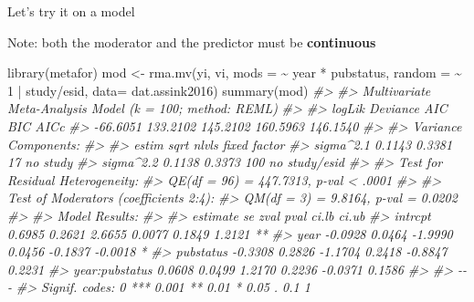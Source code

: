 \documentclass[
]{book}
\newenvironment{Shaded}{\begin{snugshade}}{\end{snugshade}}
\newcommand{\AttributeTok}[1]{\textcolor[rgb]{0.77,0.63,0.00}{#1}}
\newcommand{\CommentTok}[1]{\textcolor[rgb]{0.56,0.35,0.01}{\textit{#1}}}
\newcommand{\DecValTok}[1]{\textcolor[rgb]{0.00,0.00,0.81}{#1}}
\newcommand{\FunctionTok}[1]{\textcolor[rgb]{0.00,0.00,0.00}{#1}}
\newcommand{\NormalTok}[1]{#1}
\newcommand{\OtherTok}[1]{\textcolor[rgb]{0.56,0.35,0.01}{#1}}
\newcommand{\SpecialCharTok}[1]{\textcolor[rgb]{0.00,0.00,0.00}{#1}}
\begin{document}
Let's try it on a model

Note: both the moderator and the predictor must be \textbf{continuous}

\begin{Shaded}
\begin{Highlighting}[]
\FunctionTok{library}\NormalTok{(metafor)}
\NormalTok{mod }\OtherTok{\textless{}{-}} \FunctionTok{rma.mv}\NormalTok{(yi, vi, }\AttributeTok{mods =} \SpecialCharTok{\textasciitilde{}}\NormalTok{ year }\SpecialCharTok{*}\NormalTok{ pubstatus, }\AttributeTok{random =} \SpecialCharTok{\textasciitilde{}} \DecValTok{1} \SpecialCharTok{|}\NormalTok{ study}\SpecialCharTok{/}\NormalTok{esid, }\AttributeTok{data=}\NormalTok{ dat.assink2016)}
\FunctionTok{summary}\NormalTok{(mod)}
\CommentTok{\#\textgreater{} }
\CommentTok{\#\textgreater{} Multivariate Meta{-}Analysis Model (k = 100; method: REML)}
\CommentTok{\#\textgreater{} }
\CommentTok{\#\textgreater{}   logLik  Deviance       AIC       BIC      AICc   }
\CommentTok{\#\textgreater{} {-}66.6051  133.2102  145.2102  160.5963  146.1540   }
\CommentTok{\#\textgreater{} }
\CommentTok{\#\textgreater{} Variance Components:}
\CommentTok{\#\textgreater{} }
\CommentTok{\#\textgreater{}             estim    sqrt  nlvls  fixed      factor }
\CommentTok{\#\textgreater{} sigma\^{}2.1  0.1143  0.3381     17     no       study }
\CommentTok{\#\textgreater{} sigma\^{}2.2  0.1138  0.3373    100     no  study/esid }
\CommentTok{\#\textgreater{} }
\CommentTok{\#\textgreater{} Test for Residual Heterogeneity:}
\CommentTok{\#\textgreater{} QE(df = 96) = 447.7313, p{-}val \textless{} .0001}
\CommentTok{\#\textgreater{} }
\CommentTok{\#\textgreater{} Test of Moderators (coefficients 2:4):}
\CommentTok{\#\textgreater{} QM(df = 3) = 9.8164, p{-}val = 0.0202}
\CommentTok{\#\textgreater{} }
\CommentTok{\#\textgreater{} Model Results:}
\CommentTok{\#\textgreater{} }
\CommentTok{\#\textgreater{}                 estimate      se     zval    pval    ci.lb    ci.ub     }
\CommentTok{\#\textgreater{} intrcpt           0.6985  0.2621   2.6655  0.0077   0.1849   1.2121  ** }
\CommentTok{\#\textgreater{} year             {-}0.0928  0.0464  {-}1.9990  0.0456  {-}0.1837  {-}0.0018   * }
\CommentTok{\#\textgreater{} pubstatus        {-}0.3308  0.2826  {-}1.1704  0.2418  {-}0.8847   0.2231     }
\CommentTok{\#\textgreater{} year:pubstatus    0.0608  0.0499   1.2170  0.2236  {-}0.0371   0.1586     }
\CommentTok{\#\textgreater{} }
\CommentTok{\#\textgreater{} {-}{-}{-}}
\CommentTok{\#\textgreater{} Signif. codes:  0 \textquotesingle{}***\textquotesingle{} 0.001 \textquotesingle{}**\textquotesingle{} 0.01 \textquotesingle{}*\textquotesingle{} 0.05 \textquotesingle{}.\textquotesingle{} 0.1 \textquotesingle{} \textquotesingle{} 1}


\end{Highlighting}
\end{Shaded}
\end{document}
